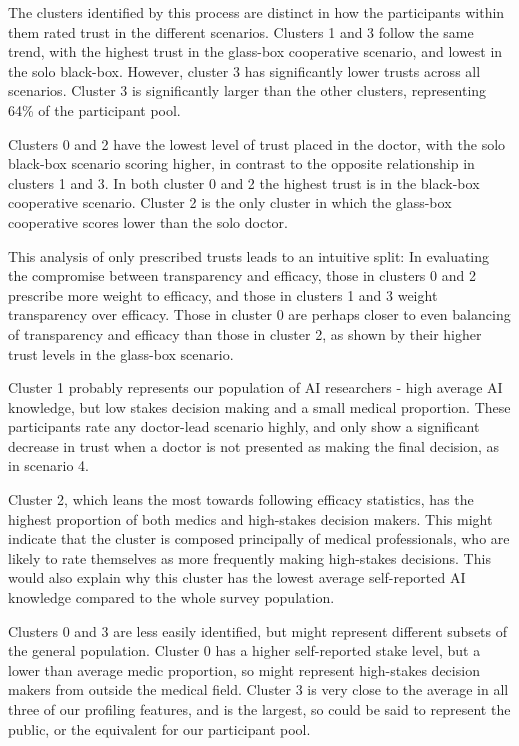 \documentclass[manuscript,screen,review]{acmart}
\begin{document}
The clusters identified by this process are distinct in how the participants within them rated trust in the different scenarios. Clusters 1 and 3 follow the same trend, with the highest trust in the glass-box cooperative scenario, and lowest in the solo black-box. However, cluster 3 has significantly lower trusts across all scenarios. Cluster 3 is significantly larger than the other clusters, representing 64\% of the participant pool.

Clusters 0 and 2 have the lowest level of trust placed in the doctor, with the solo black-box scenario scoring higher, in contrast to the opposite relationship in clusters 1 and 3. In both cluster 0 and 2 the highest trust is in the black-box cooperative scenario. Cluster 2 is the only cluster in which the glass-box cooperative scores lower than the solo doctor.

This analysis of only prescribed trusts leads to an intuitive split: In evaluating the compromise between transparency and efficacy, those in clusters 0 and 2 prescribe more weight to efficacy, and those in clusters 1 and 3 weight transparency over efficacy. Those in cluster 0 are perhaps closer to even balancing of transparency and efficacy than those in cluster 2, as shown by their higher trust levels in the glass-box scenario.

Cluster 1 probably represents our population of AI researchers - high average AI knowledge, but low stakes decision making and a small medical proportion. These participants rate any doctor-lead scenario highly, and only show a significant decrease in trust when a doctor is not presented as making the final decision, as in scenario 4.

Cluster 2, which leans the most towards following efficacy statistics, has the highest proportion of both medics and high-stakes decision makers. This might indicate that the cluster is composed principally of medical professionals, who are likely to rate themselves as more frequently making high-stakes decisions. This would also explain why this cluster has the lowest average self-reported AI knowledge compared to the whole survey population.

Clusters 0 and 3 are less easily identified, but might represent different subsets of the general population. Cluster 0 has a higher self-reported stake level, but a lower than average medic proportion, so might represent high-stakes decision makers from outside the medical field. Cluster 3 is very close to the average in all three of our profiling features, and is the largest, so could be said to represent the public, or the equivalent for our participant pool.
\end{document}
